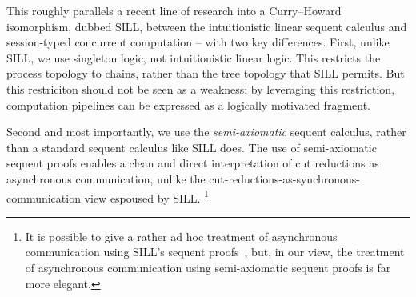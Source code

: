 This roughly parallels a recent line of research into a Curry--Howard isomorphism, dubbed \acs{SILL}, between the intuitionistic linear sequent calculus and session-typed concurrent computation\autocites{Caires+:MSCS16}{Caires+:TLDI12} -- with two key differences.
First, unlike \ac{SILL}, we use singleton logic, not intuitionistic linear logic.
This restricts the process topology to chains, rather than the tree topology that \ac{SILL} permits.
But this restriciton should not be seen as a weakness;
by leveraging this restriction, computation pipelines can be expressed as a logically motivated fragment.

Second and most importantly, we use the \emph{semi-axiomatic} sequent calculus, rather than a standard sequent calculus like \ac{SILL} does.
The use of semi-axiomatic sequent proofs enables a clean and direct interpretation of cut reductions as asynchronous communication, unlike the cut-reductions-as-syn\-chro\-nous-communication view espoused by \ac{SILL}.%
\footnote{It is possible to give a rather ad hoc treatment of asynchronous communication using \ac{SILL}'s sequent proofs~\parencite{DeYoung+:CSL12}, but, in our view, the treatment of asynchronous communication using semi-axiomatic sequent proofs is far more elegant.}







